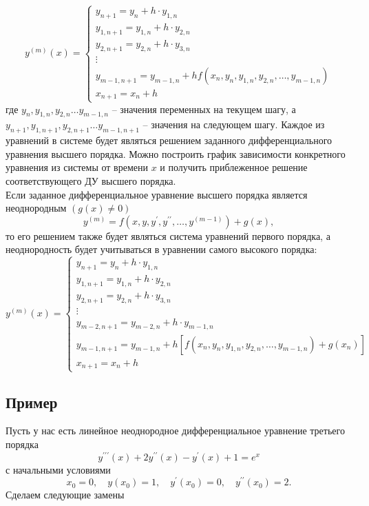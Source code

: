 \documentclass[a4paper]{article}
\newcommand{\addsubsection}[1]{\addcontentsline{toc}{subsection}{#1}
\subsection*{\centering #1}}
\begin{document}
\begin{equation*}
    y^{(m)}(x)=
    \begin{cases}
        y_{n+1}=y_n+h\cdot y_{1,n}\\
        y_{1,n+1}=y_{1,n}+h\cdot y_{2,n}\\
        y_{2,n+1}=y_{2,n}+h\cdot y_{3,n}\\
        \vdots\\
        y_{m-1,n+1}=y_{m-1,n}+ hf(x_n,y_n,y_{1,n},y_{2,n},\ldots,y_{m-1,n})\\
        x_{n+1}=x_n+h
    \end{cases}
\end{equation*}
\noindent где $y_n,y_{1,n},y_{2,n}\ldots y_{m-1,n}$ -- значения переменных на текущем шагу,
а $y_{n+1},y_{1,n+1},y_{2,n+1}\ldots y_{m-1,n+1}$ -- значения на следующем шагу.\clearpage\noindent
Каждое из уравнений в системе будет являться решением заданного дифференциального уравнения высшего
порядка. Можно построить график зависимости конкретного уравнения из системы от времени $x$ и получить
приблеженное решение соответствующего ДУ высшего порядка.\\[2mm]
Если заданное дифференциальное уравнение высшего порядка является неоднородным $(g(x)\neq 0)$
$$y^{(m)}=f(x,y,y^{\prime},y^{\prime\prime},\ldots,y^{(m-1)})+g(x),$$ то его решением также
будет являться система уравнений первого порядка, а неоднородность
будет учитываться в уравнении самого высокого порядка:
\begin{equation*}
    y^{(m)}(x)=
    \begin{cases}
        y_{n+1}=y_n + h \cdot y_{1,n} \\
        y_{1,n+1}=y_{1,n} + h \cdot y_{2,n} \\
        y_{2,n+1}=y_{2,n} + h \cdot y_{3,n} \\
        \vdots \\
        y_{m-2,n+1}=y_{m-2,n} + h \cdot y_{m-1,n} \\
        y_{m-1,n+1}=y_{m-1,n} + h\left[f(x_n, y_n, y_{1,n}, y_{2,n}, \ldots, y_{m-1,n}) + g(x_n)\right] \\
        x_{n+1}=x_n + h
    \end{cases}
\end{equation*}
\addsubsection{Пример}
Пусть у нас есть линейное неоднородное дифференциальное уравнение третьего порядка
$$y^{\prime\prime\prime}(x)+2y^{\prime\prime}(x)-y^{\prime}(x)+1=e^x$$
с начальными условиями
$$x_0=0,\quad y(x_0)=1,\quad y^{\prime}(x_0)=0,\quad y^{\prime\prime}(x_0)=2.$$
Сделаем следующие замены
\end{document}
